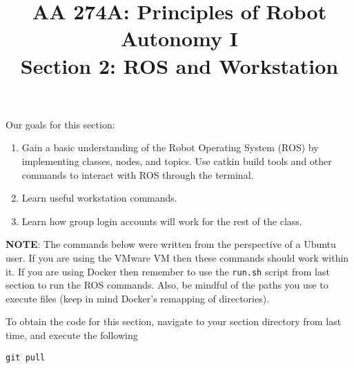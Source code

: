 \documentclass{article}
\title{AA 274A: Principles of Robot Autonomy I \\ Section 2: ROS and Workstation}
\date{}
\begin{document}
\maketitle
\pagestyle{fancy}

Our goals for this section:
\begin{enumerate}
	\item Gain a basic understanding of the Robot Operating System (ROS) by implementing classes, nodes, and topics. Use catkin build tools and other commands to interact with ROS through the terminal.
	\item Learn useful workstation commands.
	\item Learn how group login accounts will work for the rest of the class. 
\end{enumerate}

\textbf{NOTE}: The commands below were written from the perspective of a Ubuntu user. If you are using the VMware VM then these commands should work within it. If you are using Docker then remember to use the \texttt{run.sh} script from last section to run the ROS commands. Also, be mindful of the paths you use to execute files (keep in mind Docker's remapping of directories).

To obtain the code for this section, navigate to your section directory from last time, and execute the following

\begin{lstlisting}
git pull
\end{lstlisting}



\end{document}
